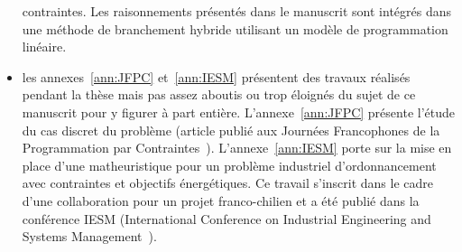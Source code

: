 \begin{itemize}
  contraintes. Les raisonnements présentés dans le manuscrit sont
  intégrés dans une méthode de branchement hybride utilisant un modèle
  de programmation linéaire.  
\item les annexes~\ref{ann:JFPC} et~\ref{ann:IESM} présentent des
  travaux réalisés pendant la thèse mais pas assez aboutis ou trop
  éloignés du sujet de ce manuscrit pour y figurer à part entière.
  L'annexe~\ref{ann:JFPC} présente l'étude du cas discret du problème
  (article publié aux Journées Francophones de la Programmation par
  Contraintes~\cite{Nattaf_JFPC}). L'annexe~\ref{ann:IESM} porte sur
  la mise en place d'une matheuristique pour un problème industriel
  d'ordonnancement avec contraintes et objectifs énergétiques. Ce
  travail s'inscrit dans le cadre d'une collaboration pour un projet
  franco-chilien et a été publié dans la conférence IESM (International
  Conference on Industrial Engineering and Systems
  Management~\cite{Nattaf_IESM}). 
\end{itemize}










